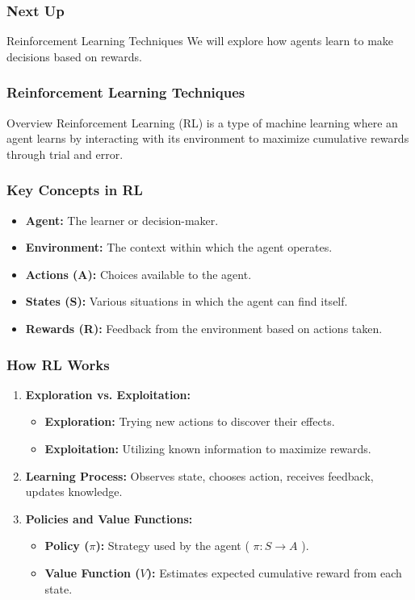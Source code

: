 \documentclass[aspectratio=169]{beamer}
\begin{document}
\begin{frame}[fragile]
    \frametitle{Next Up}
    \begin{block}{Reinforcement Learning Techniques}
        We will explore how agents learn to make decisions based on rewards.
    \end{block}
\end{frame}

\begin{frame}[fragile]
    \frametitle{Reinforcement Learning Techniques}
    \begin{block}{Overview}
        Reinforcement Learning (RL) is a type of machine learning where an agent learns by interacting with its environment to maximize cumulative rewards through trial and error.
    \end{block}
\end{frame}

\begin{frame}[fragile]
    \frametitle{Key Concepts in RL}
    \begin{itemize}
        \item \textbf{Agent:} The learner or decision-maker.
        \item \textbf{Environment:} The context within which the agent operates.
        \item \textbf{Actions (A):} Choices available to the agent.
        \item \textbf{States (S):} Various situations in which the agent can find itself.
        \item \textbf{Rewards (R):} Feedback from the environment based on actions taken.
    \end{itemize}
\end{frame}

\begin{frame}[fragile]
    \frametitle{How RL Works}
    \begin{enumerate}
        \item \textbf{Exploration vs. Exploitation:}
            \begin{itemize}
                \item \textbf{Exploration:} Trying new actions to discover their effects.
                \item \textbf{Exploitation:} Utilizing known information to maximize rewards.
            \end{itemize}
        
        \item \textbf{Learning Process:} Observes state, chooses action, receives feedback, updates knowledge.
        
        \item \textbf{Policies and Value Functions:}
            \begin{itemize}
                \item \textbf{Policy ($\pi$):} Strategy used by the agent ( $\pi: S \to A$ ).
                \item \textbf{Value Function ($V$):} Estimates expected cumulative reward from each state.
            \end{itemize}
    \end{enumerate}
\end{frame}
\end{document}
